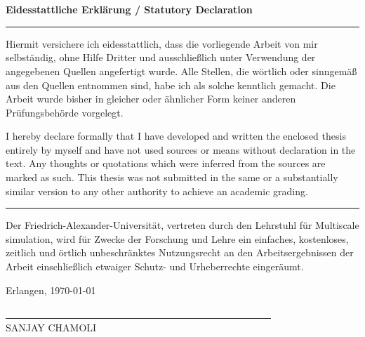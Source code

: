 %
%


\chapter*{\ }


\vspace*{\fill}


\begin{Large}
	\textbf{Eidesstattliche Erklärung / Statutory Declaration}
\end{Large}
\vspace{1.5em}


\noindent\hrule

Hiermit versichere ich eidesstattlich, dass die vorliegende Arbeit von mir
selbständig, ohne Hilfe Dritter und ausschließlich unter Verwendung der
angegebenen Quellen angefertigt wurde. Alle Stellen, die wörtlich oder
sinngemäß aus den Quellen entnommen sind, habe ich als solche kennt\-lich
gemacht. Die Arbeit wurde bisher in gleicher oder ähnlicher Form keiner anderen
Prüfungsbehörde vorgelegt. 
\vspace{1.5em}


I hereby declare formally that I have developed and written the enclosed thesis
entirely by myself and have not used sources or means without declaration in
the text. Any thoughts or quotations which were inferred from the sources are
marked as such. This thesis was not submitted in the same or a substantially
similar version to any other authority to achieve an academic grading. 

\noindent\hrule

\vspace{2em}


Der Friedrich-Alexander-Universität, vertreten durch den Lehrstuhl
für Multiscale simulation, wird für Zwecke der Forschung und Lehre ein
einfaches, kostenloses, zeitlich und örtlich unbeschränktes
Nutzungsrecht an den Arbeitsergebnissen der Arbeit einschließlich
etwaiger Schutz- und Urheberrechte eingeräumt.


\vspace{2em}

Erlangen, \today
\begin{flushright}
	\underline{\ \ \ \ \ \ \ \ \ \ \ \ \ \ \ \ \ \ \ \ \ \ \ \ \ 
		\ \ \ \ \ \ \ \ \ \ \ \ \ \ \ \ \ \ \ \ \ \ \ \ \ \ \ \ \ 
	} \\
	\small{SANJAY CHAMOLI}
\end{flushright}
